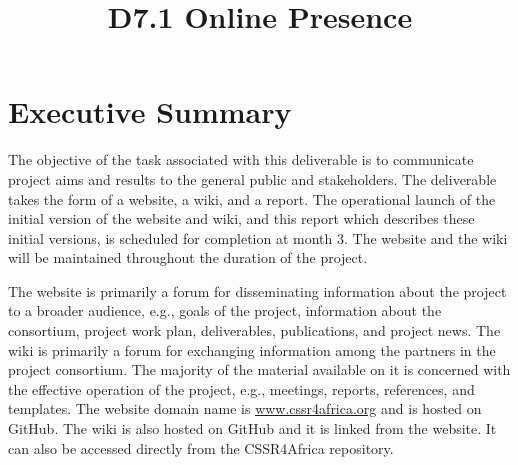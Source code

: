 \documentclass{CSSRforAfrica}
\begin{document}



\title{D7.1 Online Presence}    





\maketitle
 

\section*{Executive Summary}
\label{executive_summary}
 
The objective of the task associated with this deliverable is to communicate project aims and results to the general public and stakeholders.  
The deliverable takes the form of a website, a wiki, and a report.  The  operational launch of the initial version of the website and wiki, and this report which describes these initial versions, is scheduled for completion at month 3. The website and the wiki will be maintained throughout the duration of the project.

 The website is primarily a forum for disseminating information about the project to a broader audience, e.g., goals of the project, information about the consortium, project work plan, deliverables, publications, and project news.
The wiki is primarily a forum for exchanging information among the partners in the project consortium. The majority of the material available on it is concerned with the effective operation of the project, e.g., meetings, reports, references, and templates.
The website domain name is {\small \url {www.cssr4africa.org}} and is hosted on GitHub. The wiki is also hosted on GitHub and it is linked from the website. It can also be accessed directly from the CSSR4Africa repository.
\end{document}
